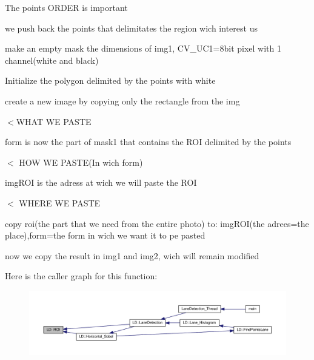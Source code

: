 The points O\+R\+D\+ER is important

we push back the points that delimitates the region wich interest us

make an empty mask the dimensions of img1, C\+V\+\_\+U\+C1=8bit pixel with 1 channel(white and black)

Initialize the polygon delimited by the points with white

create a new image by copying only the rectangle from the img

$<$W\+H\+AT WE P\+A\+S\+TE

form is now the part of mask1 that contains the R\+OI delimited by the points

$<$ H\+OW WE P\+A\+S\+T\+E(\+In wich form)

img\+R\+OI is the adress at wich we will paste the R\+OI

$<$ W\+H\+E\+RE WE P\+A\+S\+TE

copy roi(the part that we need from the entire photo) to\+: img\+R\+OI(the adrees=the place),form=the form in wich we want it to pe pasted

now we copy the result in img1 and img2, wich will remain modified 

Here is the caller graph for this function\+:\nopagebreak
\begin{figure}[H]
\begin{center}
\leavevmode
\includegraphics[width=350pt]{namespaceLD_a2dbaaf7a39ee2d6d46c4f67cae71f651_icgraph}
\end{center}
\end{figure}


